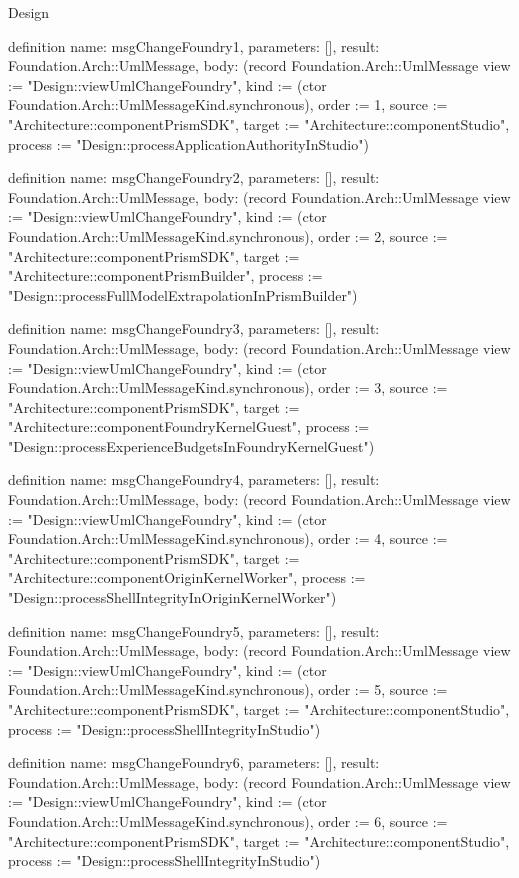 \begin{lexlean}{Design}
\begin{semanticmodule}
definition{
  name: msgChangeFoundry1,
  parameters: [],
  result: Foundation.Arch::UmlMessage,
  body: (record Foundation.Arch::UmlMessage {view := "Design::viewUmlChangeFoundry", kind := (ctor Foundation.Arch::UmlMessageKind.synchronous), order := 1, source := "Architecture::componentPrismSDK", target := "Architecture::componentStudio", process := "Design::processApplicationAuthorityInStudio"})
}

definition{
  name: msgChangeFoundry2,
  parameters: [],
  result: Foundation.Arch::UmlMessage,
  body: (record Foundation.Arch::UmlMessage {view := "Design::viewUmlChangeFoundry", kind := (ctor Foundation.Arch::UmlMessageKind.synchronous), order := 2, source := "Architecture::componentPrismSDK", target := "Architecture::componentPrismBuilder", process := "Design::processFullModelExtrapolationInPrismBuilder"})
}

definition{
  name: msgChangeFoundry3,
  parameters: [],
  result: Foundation.Arch::UmlMessage,
  body: (record Foundation.Arch::UmlMessage {view := "Design::viewUmlChangeFoundry", kind := (ctor Foundation.Arch::UmlMessageKind.synchronous), order := 3, source := "Architecture::componentPrismSDK", target := "Architecture::componentFoundryKernelGuest", process := "Design::processExperienceBudgetsInFoundryKernelGuest"})
}

definition{
  name: msgChangeFoundry4,
  parameters: [],
  result: Foundation.Arch::UmlMessage,
  body: (record Foundation.Arch::UmlMessage {view := "Design::viewUmlChangeFoundry", kind := (ctor Foundation.Arch::UmlMessageKind.synchronous), order := 4, source := "Architecture::componentPrismSDK", target := "Architecture::componentOriginKernelWorker", process := "Design::processShellIntegrityInOriginKernelWorker"})
}

definition{
  name: msgChangeFoundry5,
  parameters: [],
  result: Foundation.Arch::UmlMessage,
  body: (record Foundation.Arch::UmlMessage {view := "Design::viewUmlChangeFoundry", kind := (ctor Foundation.Arch::UmlMessageKind.synchronous), order := 5, source := "Architecture::componentPrismSDK", target := "Architecture::componentStudio", process := "Design::processShellIntegrityInStudio"})
}

definition{
  name: msgChangeFoundry6,
  parameters: [],
  result: Foundation.Arch::UmlMessage,
  body: (record Foundation.Arch::UmlMessage {view := "Design::viewUmlChangeFoundry", kind := (ctor Foundation.Arch::UmlMessageKind.synchronous), order := 6, source := "Architecture::componentPrismSDK", target := "Architecture::componentStudio", process := "Design::processShellIntegrityInStudio"})
}


\end{semanticmodule}
\end{lexlean}
